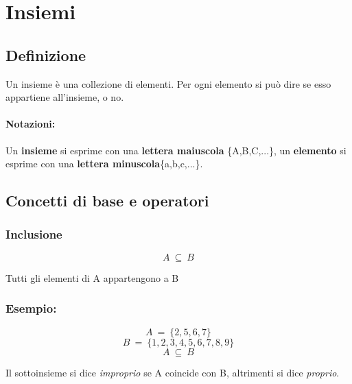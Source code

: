 \section{Insiemi}
    \subsection{Definizione}
        Un insieme è una collezione di elementi. Per ogni elemento si può dire se esso appartiene all'insieme, o no.
    \paragraph{Notazioni:}Un \textbf{insieme} si esprime con una \textbf{lettera maiuscola} \{A,B,C,...\}, 
        un \textbf{elemento} si esprime con una \textbf{lettera minuscola}\{a,b,c,...\}.

    \subsection{Concetti di base e operatori}
    \subsubsection{Inclusione}
        \begin{Large}
            \begin{equation*}
                A\ \subseteq\ B
            \end{equation*}
        \end{Large}
        Tutti gli elementi di A appartengono a B\newline
        
        \subsubsection*{Esempio:}
        
        \begin{Large}
            \begin{equation*}
                A\ =\ \{2,5,6,7\}
            \end{equation*}
            \begin{equation*}
                B\ =\ \{1,2,3,4,5,6,7,8,9\}
            \end{equation*}
            \begin{equation*}
                A\ \subseteq\ B
            \end{equation*}
        \end{Large}
        Il sottoinsieme si dice \textit{improprio} se A coincide con B, altrimenti si dice \textit{proprio}.

